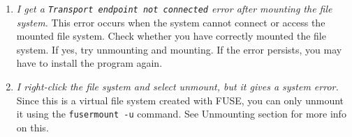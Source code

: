 \begin{enumerate}
\item \emph{I get a \texttt{Transport endpoint not connected} error after mounting the file system.} \newline
This error occurs when the system cannot connect or access the mounted file system. Check whether you have correctly mounted the file system. If yes, try unmounting and mounting. If the error persists, you may have to install the program again.
\item \emph{I right-click the file system and select unmount, but it gives a system error.} \newline
Since this is a virtual file system created with FUSE, you can only unmount it using the \texttt{fusermount -u} command. See Unmounting section for more info on this.

\end{enumerate}